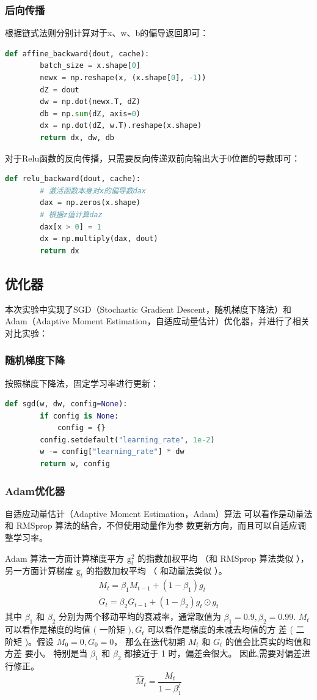 \documentclass[withoutpreface,bwprint]{cumcmthesis} %
\begin{document}
\subsubsection{后向传播}
根据链式法则分别计算对于x、w、b的偏导返回即可：
\begin{lstlisting}[language=python]
	def affine_backward(dout, cache):
	    batch_size = x.shape[0]
	    newx = np.reshape(x, (x.shape[0], -1))
	    dZ = dout
	    dw = np.dot(newx.T, dZ)
	    db = np.sum(dZ, axis=0)
	    dx = np.dot(dZ, w.T).reshape(x.shape)
	    return dx, dw, db
\end{lstlisting}
对于Relu函数的反向传播，只需要反向传递双前向输出大于0位置的导数即可：
\begin{lstlisting}[language=python]
	def relu_backward(dout, cache):
	    # 激活函数本身对x的偏导数dax
	    dax = np.zeros(x.shape)
	    # 根据z值计算daz
	    dax[x > 0] = 1
	    dx = np.multiply(dax, dout)
	    return dx
\end{lstlisting}

\subsection{优化器}

本次实验中实现了SGD（Stochastic Gradient Descent，随机梯度下降法）和Adam（Adaptive Moment Estimation，自适应动量估计）优化器，并进行了相关对比实验：


\subsubsection{随机梯度下降}
按照梯度下降法，固定学习率进行更新：
\begin{lstlisting}[language=python]
	def sgd(w, dw, config=None):
	    if config is None:
	        config = {}
	    config.setdefault("learning_rate", 1e-2)
	    w -= config["learning_rate"] * dw
	    return w, config
\end{lstlisting}
\subsubsection{Adam优化器}
自适应动量估计（Adaptive Moment Estimation，Adam）算法 \cite{1} 可以看作是动量法和 RMSprop 算法\cite{2}的结合，不但使用动量作为参
数更新方向，而且可以自适应调整学习率。


Adam 算法一方面计算梯度平方 $\mathrm{g}_{t}^{2}$ 的指数加权平均 （和 RMSprop 算法类似 ）， 另一方面计算梯度 $\mathrm{g}_{t}$ 的指数加权平均 （ 和动量法类似 ）。
$$
\begin{array}{c}
M_{t}=\beta_{1} M_{t-1}+\left(1-\beta_{1}\right) g_{t} \\
G_{t}=\beta_{2} G_{t-1}+\left(1-\beta_{2}\right) g_{t} \odot g_{t}
\end{array}
$$
其中 $\beta_{1}$ 和 $\beta_{2}$ 分别为两个移动平均的衰减率，通常取值为 $\beta_{1}=0.9, \beta_{2}=0.99$.
$M_{t}$ 可以看作是梯度的均值 $($ 一阶矩 $), G_{t}$ 可以看作是梯度的未减去均值的方 差 ( 二阶矩 )。假设 $M_{0}=0, G_{0}=0$， 那么在迭代初期 $M_{t}$ 和 $G_{t}$ 的值会比真实的均值和方差 要小。 特别是当 $\beta_{1}$ 和 $\beta_{2}$ 都接近于 1 时，偏差会很大。 因此,需要对偏差进行修正。
$$
\hat{M}_{t}=\frac{M_{t}}{1-\beta_{1}^{t}}
$$
\end{document}
